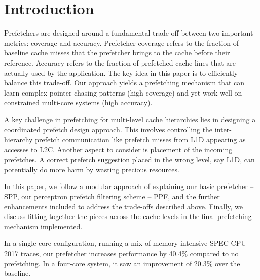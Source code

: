 \section{Introduction}
\label{Introduction}

Prefetchers are designed around a fundamental trade-off between two
important metrics: coverage and accuracy. Prefetcher coverage refers
to the fraction of baseline cache misses that the prefetcher brings to
the cache before their reference. Accuracy refers to the fraction of
prefetched cache lines that are actually used by the application. The
key idea in this paper is to efficiently balance this trade-off. Our
approach yields a prefetching mechanism that can learn complex
pointer-chasing patterns (high coverage) and yet work well on
constrained multi-core systems (high accuracy).

A key challenge in prefetching for multi-level cache hierarchies lies
in designing a coordinated prefetch design approach.  This involves
controlling the inter-hierarchy prefetch communication like prefetch
misses from L1D appearing as accesses to L2C.  Another aspect to
consider is placement of the incoming prefetches.  A correct prefetch
suggestion placed in the wrong level, say L1D, can potentially do more
harm by wasting precious resources.

In this paper, we follow a modular approach of explaining our basic
prefetcher -- SPP, our perceptron prefetch filtering scheme -- PPF, and the
further enhancements included to address the trade-offs described
above.  Finally, we discuss fitting together the pieces across the
cache levels in the final prefetching mechanism implemented.

In a single core configuration, running a mix of memory intensive SPEC
CPU 2017 traces, our prefetcher increases performance by 40.4\% compared to no
prefetching.  In a four-core system, it saw an improvement of 20.3\%
over the baseline.


